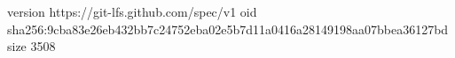 version https://git-lfs.github.com/spec/v1
oid sha256:9cba83e26eb432bb7c24752eba02e5b7d11a0416a28149198aa07bbea36127bd
size 3508
